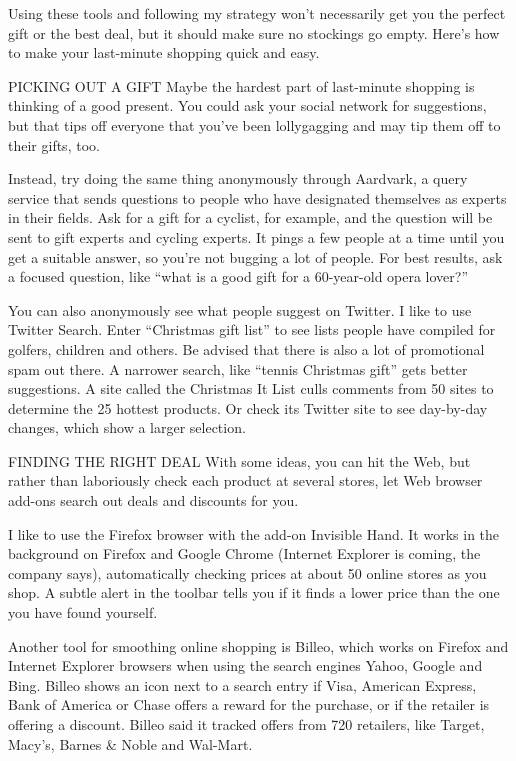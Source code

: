﻿\documentclass[12pt]{article}
\begin{document}
Using these tools and following my strategy won't necessarily get you the perfect gift or the best
deal, but it should make sure no stockings go empty. Here's how to make your last-minute shopping
quick and easy.

PICKING OUT A GIFT Maybe the hardest part of last-minute shopping is thinking of a good present. You
could ask your social network for suggestions, but that tips off everyone that you've been
lollygagging and may tip them off to their gifts, too.

Instead, try doing the same thing anonymously through Aardvark, a query service that sends questions
to people who have designated themselves as experts in their fields. Ask for a gift for a cyclist,
for example, and the question will be sent to gift experts and cycling experts. It pings a few
people at a time until you get a suitable answer, so you're not bugging a lot of people. For best
results, ask a focused question, like ``what is a good gift for a 60-year-old opera lover?''

You can also anonymously see what people suggest on Twitter. I like to use Twitter Search. Enter
``Christmas gift list'' to see lists people have compiled for golfers, children and others. Be
advised that there is also a lot of promotional spam out there. A narrower search, like ``tennis
Christmas gift'' gets better suggestions. A site called the Christmas It List culls comments from 50
sites to determine the 25 hottest products. Or check its Twitter site to see day-by-day changes,
which show a larger selection.

FINDING THE RIGHT DEAL With some ideas, you can hit the Web, but rather than laboriously check each
product at several stores, let Web browser add-ons search out deals and discounts for you.

I like to use the Firefox browser with the add-on Invisible Hand. It works in the background on
Firefox and Google Chrome (Internet Explorer is coming, the company says), automatically checking
prices at about 50 online stores as you shop. A subtle alert in the toolbar tells you if it finds a
lower price than the one you have found yourself.

Another tool for smoothing online shopping is Billeo, which works on Firefox and Internet Explorer
browsers when using the search engines Yahoo, Google and Bing. Billeo shows an icon next to a search
entry if Visa, American Express, Bank of America or Chase offers a reward for the purchase, or if
the retailer is offering a discount. Billeo said it tracked offers from 720 retailers, like Target,
Macy's, Barnes \& Noble and Wal-Mart.
\end{document}
